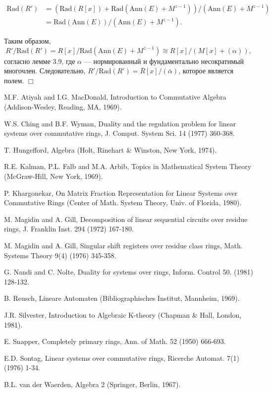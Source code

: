 \documentclass[a4paper,12pt]{article}
\newcommand{\Ann}{\text{Ann}}
\newcommand{\Rad}{\text{Rad}}
\begin{document}
$$ \begin{aligned}
\Rad(R') &= (\Rad(R[x]) + \Rad(\Ann(E)+M^{z-1}))/(\Ann(E)+M^{z-1}) \\
		&= \Rad(\Ann(E)) / (\Ann(E)+M^{z-1}).
\end{aligned}$$

Таким образом,
$$
R' / \Rad(R') = R[x] / \Rad(\Ann(E)+M^{z-1}) \cong R[x] / (M[x] + (\alpha)),
$$
согласно лемме 3.9, где $\alpha$ --- нормированный и фундаментально несократимый многочлен. Следовательно, $R'/\Rad(R') = \overline{R}[x]/(\bar{\alpha})$, которое является полем. $\Box$



\pagebreak
\begin{thebibliography}{99}
	
	M.F. Atiyah and I.G. MacDonald,
	Introduction to Commutative Algebra
	(Addison-Wesley, Reading, MA, 1969).
	
	W.S. Ching and B.F. Wyman,
	Duality and the regulation problem for linear systems over commutative rings,
	J. Comput. System Sci. 14 (1977) 360-368.

	T. Hungefford,
	Algebra
	(Holt, Rinehart \& Winston, New York, 1974).
	
	R.E. Kalman, P.L. Falb and M.A. Arbib,
	Topics in Mathematical System Theory
	(McGraw-Hill, New York, 1969).
	
	P. Khargonekar, On Matrix Fraction Representation for Linear Systems over Commutative Rings
	(Center of Math. System Theory, Univ. of Florida, 1980).
	
	M. Magidin and A. Gill,
	Decomposition of linear sequential circuits over residue rings,
	J. Franklin Inst. 294 (1972) 167-180.
	
	M. Magidin and A. Gill,
	Singular shift registers over residue class rings,
	Math. Systems Theory 9(4) (1976) 345-358.
	
	G. Nandi and C. Nolte,
	Duality for systems over rings,
	Inform. Control 50. (1981) 128-132.
	
	B. Reusch,
	Lineare Automaten
	(Bibliographisches Institut, Mannheim, 1969).
	
	J.R. Silvester,
	Introduction to Algebraic K-theory
	(Chapman \& Hall, London, 1981).
	
	E. Snapper,
	Completely primary rings,
	Ann. of Math. 52 (1950) 666-693.
	
	E.D. Sontag,
	Linear systems over commutative rings, Ricerche Automat.
	7(1) (1976) 1-34.
	
	B.L. van der Waerden,
	Algebra 2
	(Springer, Berlin, 1967).
	
\end{thebibliography}
\end{document}
